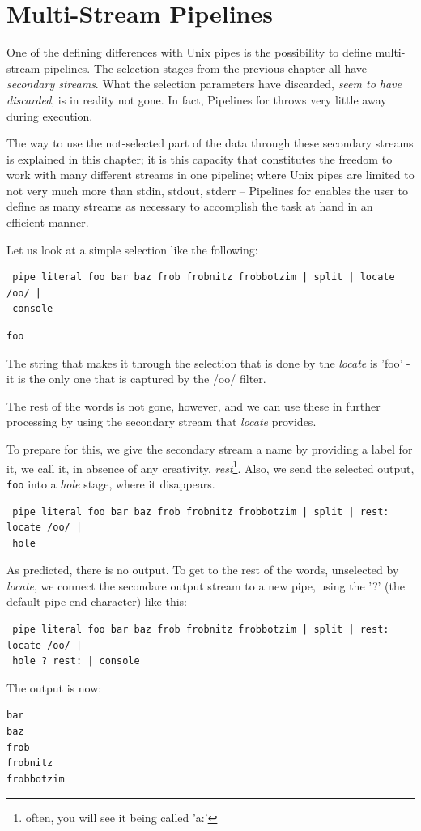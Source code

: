 \chapter{Multi-Stream Pipelines}
One of the defining differences with Unix pipes is the possibility to
define multi-stream pipelines. The selection stages from the previous
chapter all have \emph{secondary streams}. What the selection
parameters have discarded, \emph{seem to have discarded}, is in
reality not gone. In fact, Pipelines for \nr{} throws very little away during
execution.

The way to use the not-selected part of the data through
these secondary streams is explained in this chapter; it is this
capacity that constitutes the freedom to work with many different
streams in one pipeline; where Unix pipes are limited to not very much
more than stdin, stdout, stderr -- Pipelines for \nr{} enables the user
to define as many streams as necessary to accomplish the task at hand
in an efficient manner.

Let us look at a simple selection like the following:

\begin{lstlisting}
 pipe literal foo bar baz frob frobnitz frobbotzim | split | locate /oo/ |
 console
\end{lstlisting}
\begin{verbatim}
foo
\end{verbatim}
The string that makes it through the selection that is done by the
\emph{locate} is 'foo' - it is the only one that is captured by the
/oo/ filter.

The rest of the words is not gone, however, and we can use these in
further processing by using the secondary stream that \emph{locate}
provides.

To prepare for this, we give the secondary stream a name by providing
a label for it, we call it, in absence of any creativity,
\emph{rest}\footnote{often, you will see it being called 'a:'}. Also, we send the selected output, \texttt{foo} into a
\emph{hole} stage, where it disappears.
\begin{lstlisting}
 pipe literal foo bar baz frob frobnitz frobbotzim | split | rest: locate /oo/ |
 hole
\end{lstlisting}
As predicted, there is no output. To get to the rest of the words,
unselected by \emph{locate}, we connect the secondare output stream to
a new pipe, using the '?' (the default pipe-end character) like this:
\begin{lstlisting}
 pipe literal foo bar baz frob frobnitz frobbotzim | split | rest: locate /oo/ |
 hole ? rest: | console
\end{lstlisting}
The output is now:
\begin{verbatim}
bar
baz
frob
frobnitz
frobbotzim
\end{verbatim}

